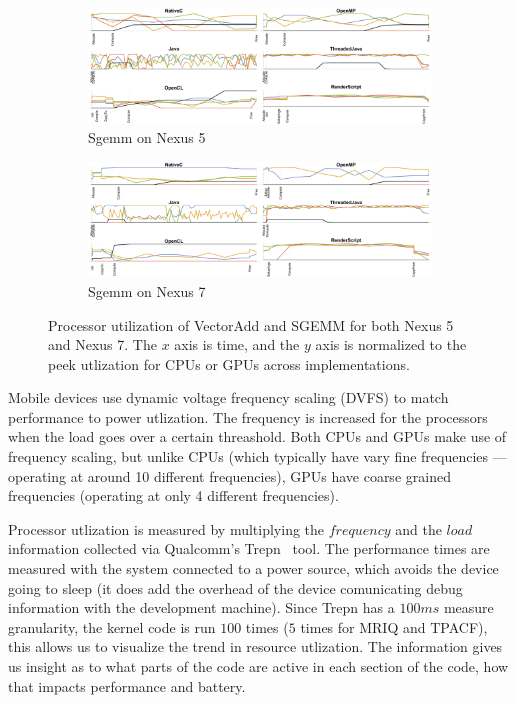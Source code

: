 \begin{figure}[htp]
  \begin{subfigure}[b]{0.85\textwidth}
       \centering
       \includegraphics[width=\textwidth]{data/load_sgemm_nexus5.pdf}
       \caption{Sgemm on Nexus 5}\label{fig:Sgemm5}
   \end{subfigure}
  \begin{subfigure}[b]{0.85\textwidth}
       \centering
       \includegraphics[width=\textwidth]{data/load_sgemm_nexus7.pdf}
       \caption{Sgemm on Nexus 7}\label{fig:Sgemm7}
   \end{subfigure}


  \caption{Processor utilization of VectorAdd and SGEMM for both Nexus 5 and Nexus 7. The $x$ axis is time, and the $y$ axis is normalized to the peek utlization for CPUs or GPUs across implementations.}
  \label{fig:loadVecAddSgemm}
\end{figure}
\FloatBarrier

Mobile devices use dynamic voltage frequency scaling (DVFS)
  to match performance to power utlization.
The frequency is increased for the processors when the load goes over a certain
  threashold.
Both CPUs and GPUs make use of frequency scaling, but unlike CPUs (which typically
  have vary fine frequencies --- operating at around 10 different frequencies), GPUs
  have coarse grained frequencies (operating at only 4 different frequencies).  

Processor utlization is measured by multiplying the $frequency$ and the $load$ information collected via Qualcomm's Trepn~\cite{profilerqualcomm} tool.
The performance times are measured with the system connected to a
  power source, which avoids the device going to sleep (it does add the
  overhead of the device comunicating debug information with the development
  machine).
Since Trepn has a $100ms$ measure granularity, the kernel code is run $100$ times
  ($5$ times for MRIQ and TPACF), this allows us to visualize the trend in resource
  utlization.
The information gives us insight as to what parts of the code are active in each
	section of the code, how that impacts performance and battery.


